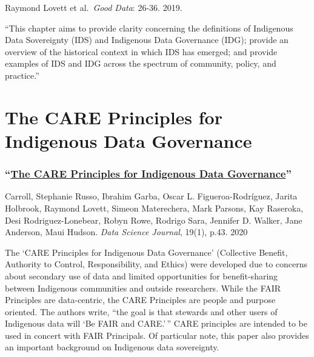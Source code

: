 \documentclass[
]{book}
\begin{document}
Raymond Lovett et al.~\emph{Good Data}: 26-36. 2019.

``This chapter aims to provide clarity concerning the definitions of Indigenous Data Sovereignty (IDS) and Indigenous Data Governance (IDG); provide an overview of the historical context in which IDS has emerged; and provide examples of IDS and IDG across the spectrum of community, policy, and practice.''

\hypertarget{the-care-principles-for-indigenous-data-governance}{%
\section{The CARE Principles for Indigenous Data Governance}\label{the-care-principles-for-indigenous-data-governance}}

\hypertarget{the-care-principles-for-indigenous-data-governance-1}{%
\subsubsection*{\texorpdfstring{``\href{http://doi.org/10.5334/dsj-2020-043}{The CARE Principles for Indigenous Data Governance}''}{``The CARE Principles for Indigenous Data Governance''}}\label{the-care-principles-for-indigenous-data-governance-1}}

Carroll, Stephanie Russo, Ibrahim Garba, Oscar L. Figueroa-Rodríguez, Jarita Holbrook, Raymond Lovett, Simeon Materechera, Mark Parsons, Kay Raseroka, Desi Rodriguez-Lonebear, Robyn Rowe, Rodrigo Sara, Jennifer D. Walker, Jane Anderson, Maui Hudson. \emph{Data Science Journal}, 19(1), p.43. 2020

The `CARE Principles for Indigenous Data Governance' (Collective Benefit, Authority to Control, Responsibility, and Ethics) were developed due to concerns about secondary use of data and limited opportunities for benefit-sharing between Indigenous communities and outside researchers. While the FAIR Principles are data-centric, the CARE Principles are people and purpose oriented. The authors write, ``the goal is that stewards and other users of Indigenous data will `Be FAIR and CARE.'\,'' CARE principles are intended to be used in concert with FAIR Principals. Of particular note, this paper also provides an important background on Indigenous data sovereignty.
\end{document}
